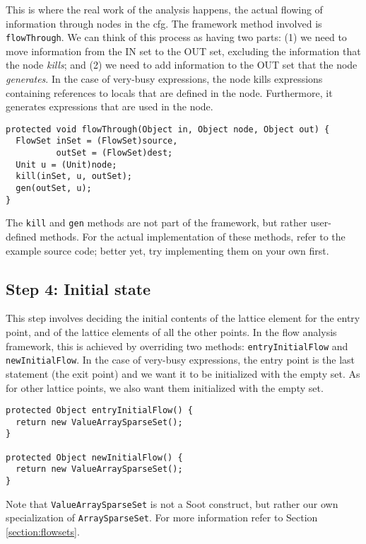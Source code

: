 \documentclass{article}
\newcommand{\code}[1]{\texttt{\small #1}}
\begin{document}
This is where the real work of the analysis happens, the actual
flowing of information through nodes in the cfg. The framework method
involved is \code{flowThrough}. We can think of this process as having
two parts: (1) we need to move information from the IN set to the OUT
set, excluding the information that the node \emph{kills}; and (2) we
need to add information to the OUT set that the node
\emph{generates}. In the case of very-busy expressions, the node kills
expressions containing references to locals that are defined in the
node. Furthermore, it generates expressions that are used in the node.
\begin{center}
  \begin{minipage}{0.95 \linewidth}
    \begin{verbatim}
protected void flowThrough(Object in, Object node, Object out) {
  FlowSet inSet = (FlowSet)source,
          outSet = (FlowSet)dest;
  Unit u = (Unit)node;
  kill(inSet, u, outSet);
  gen(outSet, u);
}
    \end{verbatim}
  \end{minipage}
\end{center}
The \code{kill} and \code{gen} methods are not part of the framework,
but rather user-defined methods. For the actual implementation of
these methods, refer to the example source code; better yet, try
implementing them on your own first.

\subsection{Step 4: Initial state}

This step involves deciding the initial contents of the lattice
element for the entry point, and of the lattice elements of all the
other points. In the flow analysis framework, this is achieved by
overriding two methods: \code{entryInitialFlow} and
\code{newInitialFlow}. In the case of very-busy expressions, the entry
point is the last statement (the exit point) and we want it to be
initialized with the empty set. As for other lattice points, we also
want them initialized with the empty set.
\begin{center}
  \begin{minipage}{0.9 \linewidth}
    \begin{verbatim}
protected Object entryInitialFlow() {
  return new ValueArraySparseSet();
}

protected Object newInitialFlow() {
  return new ValueArraySparseSet();
}
    \end{verbatim}
  \end{minipage}
\end{center}
Note that \code{ValueArraySparseSet} is not a Soot construct, but
rather our own specialization of \code{ArraySparseSet}. For more
information refer to Section \ref{section:flowsets}.
\end{document}
